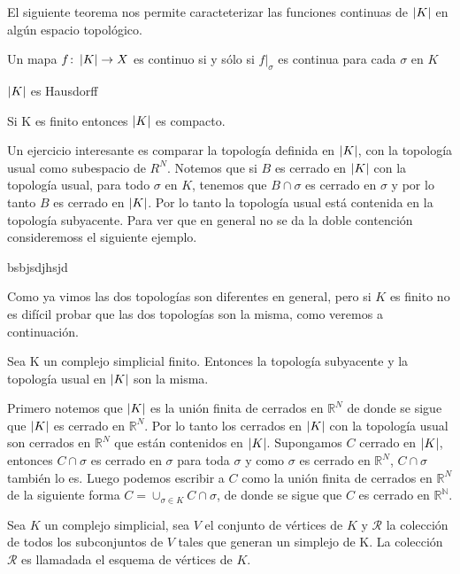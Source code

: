 El siguiente teorema nos permite caracteterizar las funciones continuas de $\left| K \right|$ en algún espacio topológico.
\begin{Teo}\label{ttc}
Un mapa $f\colon \left| K \right|\rightarrow X$ es continuo si y sólo si $f|_{\sigma}$ es continua para cada $\sigma$ en $K$
\end{Teo}
\begin{Teo}
$\left| K \right|$ es Hausdorff
\end{Teo}
\begin{Teo}
Si K es finito entonces $\left| K \right|$ es compacto.
\end{Teo}
Un ejercicio interesante es comparar la topología definida en $\left| K \right|$, con la topología usual como subespacio de $R^{N}$. Notemos que si $B$ es cerrado en $\left| K \right|$ con la topología usual, para todo $\sigma$ en $K$, tenemos que $B\cap\sigma$ es cerrado en $\sigma$ y por lo tanto $B$ es cerrado en $\left| K \right|$. Por lo tanto la topología usual está contenida en la topología subyacente. Para ver que en general no se da la doble contención consideremoss el siguiente ejemplo.
\begin{Ejem}
bsbjsdjhsjd
\end{Ejem}
Como ya vimos las dos topologías son diferentes en general, pero si $K$ es finito no es difícil probar que las dos topologías son la misma, como veremos a continuación.
\begin{Prop}
Sea K un complejo simplicial finito. Entonces la topología subyacente y la topología usual en $\left| K \right|$ son la misma.
\end{Prop}
\begin{Dem}

Primero notemos que $\left| K \right|$ es la unión finita de cerrados en $\mathbb{R}^N$ de donde se sigue que $\left| K \right|$ es cerrado en $\mathbb{R}^N$. Por lo tanto los cerrados en $\left| K \right|$ con la topología usual son cerrados en $\mathbb{R}^N$ que están contenidos en $\left| K \right|$.
Supongamos $C$ cerrado en $\left| K \right|$, entonces $C\cap\sigma$ es cerrado en $\sigma$ para toda $\sigma$ y como $\sigma$ es cerrado en $\mathbb{R}^N$, $C\cap\sigma$ también lo es. Luego podemos escribir a $C$ como la unión finita de cerrados en  $\mathbb{R}^N$ de la siguiente forma $C=\cup_{\sigma\in K}C\cap\sigma$, de donde se sigue que $C$ es cerrado en $\mathbb{R^N}$.
\end{Dem}
\begin{Defi}
Sea $K$ un complejo simplicial, sea $V$ el conjunto de vértices de $K$ y $\mathcal{R}$ la colección de todos los subconjuntos de $V$ tales que generan un simplejo de K. La colección $\mathcal{R}$ es llamadada el esquema de vértices de $K$.
\end{Defi}
